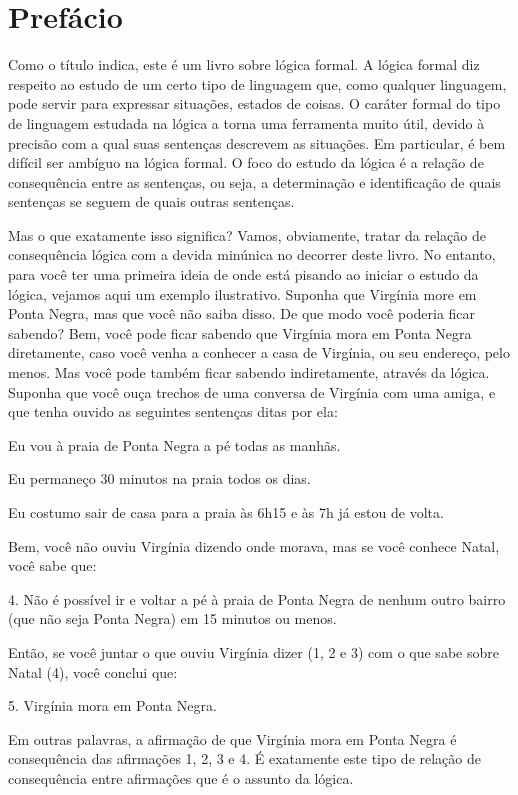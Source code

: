 \chapter{Prefácio}

Como o título indica, este é um livro sobre lógica formal.
A lógica formal diz respeito ao estudo de um certo tipo de linguagem que, como qualquer linguagem, pode servir para expressar situações, estados de coisas.
O caráter formal do tipo de linguagem estudada na lógica a torna uma ferramenta muito útil, devido à precisão com a qual suas sentenças descrevem as situações.
Em particular, é bem difícil ser ambíguo na lógica formal.
O foco do estudo da lógica é a relação de consequência entre as sentenças, ou seja, a determinação e identificação de quais sentenças se seguem de quais outras sentenças.

Mas o que exatamente isso significa?
Vamos, obviamente, tratar da relação de consequência lógica com a devida minúnica no decorrer deste livro.
No entanto, para você ter uma primeira ideia de onde está pisando ao iniciar o estudo da lógica, vejamos aqui um exemplo ilustrativo.
Suponha que Virgínia more em Ponta Negra, mas que você não saiba disso.
De que modo você poderia ficar sabendo?
Bem, você pode ficar sabendo que Virgínia mora em Ponta Negra diretamente, caso você venha a conhecer a casa de Virgínia, ou seu endereço, pelo menos.
Mas você pode também ficar sabendo indiretamente, através da lógica.
Suponha que você ouça trechos de uma conversa de Virgínia com uma amiga, e que tenha ouvido as seguintes sentenças ditas por ela:
\begin{earg}
	\item Eu vou à praia de Ponta Negra a pé todas as manhãs.
	\item Eu permaneço 30 minutos na praia todos os dias.
	\item Eu costumo sair de casa para a praia às 6h15 e às 7h já estou de volta.
\end{earg}
Bem, você não ouviu Virgínia dizendo onde morava, mas se você conhece Natal, você sabe que:

\begin{earg}
	\item[4.] Não é possível ir e voltar a pé à praia de Ponta Negra de nenhum outro bairro (que não seja Ponta Negra) em 15 minutos ou menos.
\end{earg}
Então, se você juntar o que ouviu Virgínia dizer (1, 2 e 3) com o que sabe sobre Natal (4), você conclui que:
\begin{earg}
	\item[5.]  Virgínia mora em Ponta Negra.
\end{earg}
Em outras palavras, a afirmação de que Virgínia mora em Ponta Negra é consequência das afirmações 1, 2, 3 e 4.
É exatamente este tipo de relação de consequência entre afirmações que é o assunto da lógica.

